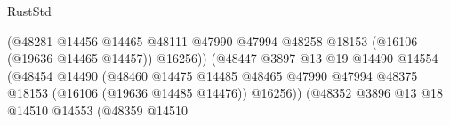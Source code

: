 \begin{lexlean}{RustStd}
\begin{coremodule}
                                                              (@48281
                                                                @14456
                                                                @14465
                                                                @48111
                                                                @47990
                                                                @47994
                                                                @48258
                                                                @18153
                                                                (@16106 (@19636 @14465 @14457))
                                                                @16256))
                                                            (@48447
                                                              @3897
                                                              @13
                                                              @19
                                                              @14490
                                                              @14554
                                                              (@48454
                                                                @14490
                                                                (@48460
                                                                  @14475
                                                                  @14485
                                                                  @48465
                                                                  @47990
                                                                  @47994
                                                                  @48375
                                                                  @18153
                                                                  (@16106 (@19636 @14485 @14476))
                                                                  @16256))
                                                              (@48352
                                                                @3896
                                                                @13
                                                                @18
                                                                @14510
                                                                @14553
                                                                (@48359
                                                                  @14510

\end{coremodule}
\end{lexlean}
